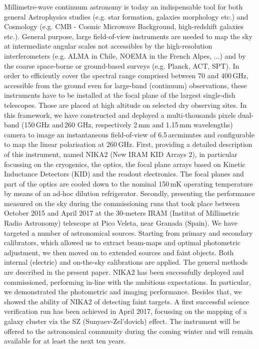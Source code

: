 \documentclass[]{aa} %
\begin{document}
  \abstract
   {Millimetre-wave continuum astronomy is today an indispensable tool for both general Astrophysics studies (e.g. star formation, galaxies morphology etc.) and Cosmology (e.g. CMB - Cosmic Microwave Background, high-redshift galaxies etc.). General purpose, large field-of-view instruments are needed to map the sky at intermediate angular scales not accessibles by the high-resolution interferometers (e.g. ALMA in Chile, NOEMA in the French Alpes, ...) and by the coarse space-borne or ground-based surveys (e.g. Planck, ACT, SPT). In order to efficiently cover the spectral range comprised between 70 and 400\,GHz, accessible from the ground even for large-band (continuum) observations, these instruments have to be installed at the focal plane of the largest single-dish telescopes. Those are placed at high altitude on selected dry observing sites. In this framework, we have constructed and deployed a multi-thousands pixels dual-band (150\,GHz and\,260 GHz, respectively 2\,mm and 1.15\,mm wavelengths) camera to image an instantaneous field-of-view of 6.5\,arcminutes and configurable to map the linear polarisation at 260\,GHz.}
   {First, providing a detailed description of this instrument, named NIKA2 (New IRAM KID Arrays 2), in particular focussing on the cryogenics, the optics, the focal plane arrays based on Kinetic Inductance Detectors (KID) and the readout electronics. The focal planes and part of the optics are cooled down to the nominal 150\,mK operating temperature by means of an ad-hoc dilution refrigerator. 
Secondly, presenting the performance measured on the sky during the commissioning runs that took place between October 2015 and April 2017 at the 30-meters IRAM (Institut of Millimetric Radio Astronomy) telescope at Pico Veleta, near Granada (Spain).}
   {We have targeted a number of astronomical sources. Starting from primary and secondary calibrators, which allowed us to extract beam-maps and optimal photometric adjustment, we then moved on to extended sources and faint objects. Both internal (electric) and on-the-sky calibrations are applied. The general methods are described in the present paper.}
   {NIKA2 has been successfully deployed and commissioned, performing in-line with the ambitious expectations. In particular, we demonstrated the photometric and imaging performance. Besides that, we showed the ability of NIKA2 of detecting faint targets. A first successful science verification run has been achieved in April 2017, focussing on the mapping of a galaxy cluster via the SZ (Sunyaev-Zel\textquoteright dovich) effect. The instrument will be offered to the astronomical community during the coming winter and will remain available for at least the next ten years.}
  {}
\end{document}
